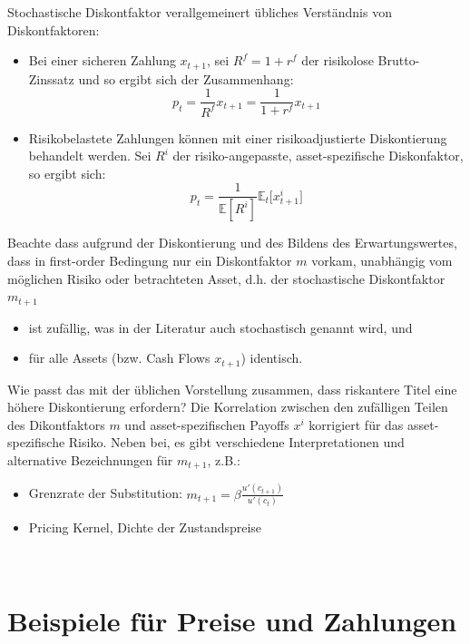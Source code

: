 \documentclass[12pt]{extreport} %
\theoremstyle{named}
\theoremstyle{nnamed}
\theoremstyle{itshape}
\theoremstyle{normal}
\begin{document}
Stochastische Diskontfaktor verallgemeinert übliches Verständnis von Diskontfaktoren:

\begin{itemize}
	\item Bei einer sicheren Zahlung $x_{t+1}$, sei $R^f = 1 + r^f$ der risikolose Brutto-Zinssatz und so ergibt sich der Zusammenhang: $$p_t = \frac{1}{R^f} x_{t+1} = \frac{1}{1+r^f} x_{t+1}$$
	\item Risikobelastete Zahlungen können mit einer risikoadjustierte Diskontierung behandelt werden. Sei $R^i$ der risiko-angepasste, asset-spezifische Diskonfaktor, so ergibt sich: $$p_t = \frac{1}{\mathbb{E} \left[R^i \right]} \mathbb{E}_t \big[ x_{t+1}^i \big]$$
\end{itemize}

Beachte dass aufgrund der Diskontierung und des Bildens des Erwartungswertes, dass in first-order Bedingung nur ein Diskontfaktor $m$ vorkam, unabhängig vom möglichen Risiko oder betrachteten Asset, d.h. der stochastische Diskontfaktor $m_{t+1}$
\begin{itemize}
	\item ist zufällig, was in der Literatur auch stochastisch genannt wird, und
	\item für alle Assets (bzw. Cash Flows $x_{t+1}$) identisch.
\end{itemize}
Wie passt das mit der üblichen Vorstellung zusammen, dass riskantere Titel eine höhere Diskontierung erfordern? Die Korrelation zwischen den zufälligen Teilen des Dikontfaktors $m$ und asset-spezifischen Payoffs $x^i$ korrigiert für das asset-spezifische Risiko. Neben bei, es gibt verschiedene Interpretationen und alternative Bezeichnungen für $m_{t+1}$, z.B.:
\begin{itemize}
	\item Grenzrate der Substitution: $m_{t+1} = \beta \frac{u'(c_{t+1})}{u'(c_t)}$
	\item Pricing Kernel, Dichte der Zustandspreise
\end{itemize}

~\newpage

\section{Beispiele für Preise und Zahlungen}
\end{document}

